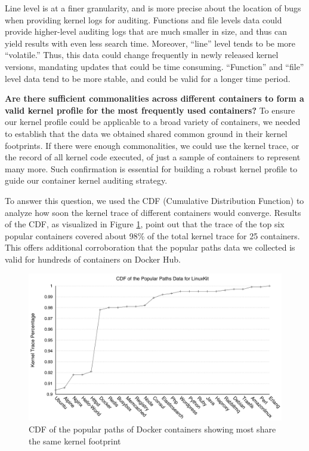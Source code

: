Line level is at a finer granularity, and is more precise about the location of bugs when providing kernel logs for auditing. 
Functions and file levels data could provide higher-level auditing logs that are much smaller in size, and thus can yield results with even less search time. 
Moreover, ``line'' level tends to be more ``volatile.'' Thus, this data could change frequently in newly released kernel versions, mandating updates that could be time consuming.  
``Function'' and ``file'' level data tend to be more stable, and could be valid for a longer time period. 

\noindent
\textbf{Are there sufficient commonalities across different containers to form a valid kernel profile for the most frequently used containers?} 
\newline
To ensure our kernel profile could be applicable to a broad variety of containers, we needed to establish that the data we obtained shared common ground in their kernel footprints. 
If there were enough commonalities, we could use the kernel trace, or the record of all kernel code executed, 
of just a sample of containers to represent many more. Such confirmation is essential for building a robust kernel profile to guide our container kernel auditing strategy.

To answer this question, we used the CDF (Cumulative Distribution Function) to analyze how soon the kernel trace of different containers would converge. 
Results of the CDF, as visualized in Figure \ref{fig:pp-cdf}, point out that the trace of the top six popular containers covered about 98\% of the total kernel trace for 25 containers. 
This offers additional corroboration that the popular paths data we collected is valid for hundreds of containers on Docker Hub.  

\begin{figure}
\centering
\includegraphics[width=1.5\columnwidth]{diagram/pp-cdf.png}
\caption{\small CDF of the popular paths of Docker containers showing most share the same kernel footprint}
\label{fig:pp-cdf}
\end{figure}

